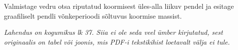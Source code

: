 
Valmistage vedru otsa riputatud koormisest üles-alla liikuv pendel ja esitage graafiliselt pendli võnkeperioodi sõltuvus koormise massist.

\hint

\solu
\textit{Lahendus on kogumikus lk 37. Siia ei ole seda veel ümber kirjutatud, sest originaalis on tabel või joonis, mis PDF-i tekstikihist loetavalt välja ei tule.}
\probend
